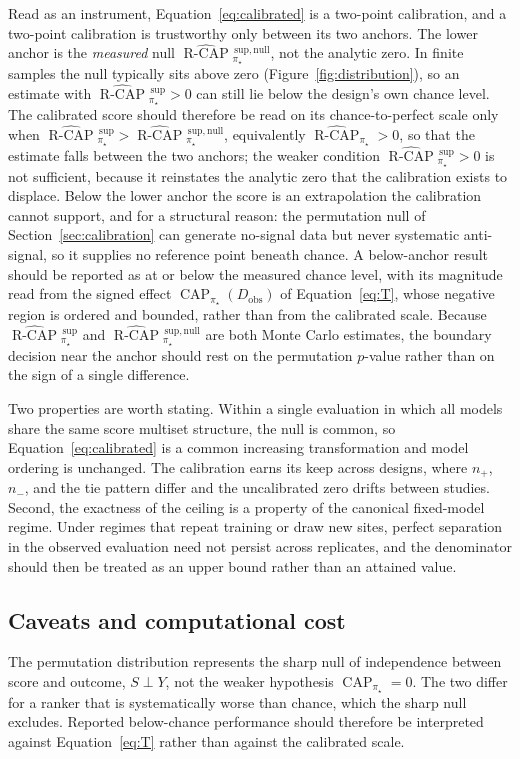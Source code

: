 \documentclass[11pt]{article}
\newcommand{\CAP}{\operatorname{CAP}}
\newcommand{\Tpi}{\CAP_{\pi_\star}}
\newcommand{\RCAPHat}{\widehat{\operatorname{R\text{-}CAP}}{}^{\,\mathrm{sup}}_{\pi_\star}}
\newcommand{\RCAPnullHat}{\widehat{\operatorname{R\text{-}CAP}}{}^{\,\mathrm{sup,null}}_{\pi_\star}}
\newcommand{\RCAPcalHat}{\widehat{\operatorname{R\text{-}CAP}}_{\pi_\star}}
\theoremstyle{remark}
\begin{document}
Read as an instrument, Equation~\eqref{eq:calibrated} is a two-point calibration, and a two-point calibration is trustworthy only between its two anchors. The lower anchor is the \emph{measured} null $\RCAPnullHat$, not the analytic zero. In finite samples the null typically sits above zero (Figure~\ref{fig:distribution}), so an estimate with $\RCAPHat>0$ can still lie below the design's own chance level. The calibrated score should therefore be read on its chance-to-perfect scale only when $\RCAPHat>\RCAPnullHat$, equivalently $\RCAPcalHat>0$, so that the estimate falls between the two anchors; the weaker condition $\RCAPHat>0$ is not sufficient, because it reinstates the analytic zero that the calibration exists to displace. Below the lower anchor the score is an extrapolation the calibration cannot support, and for a structural reason: the permutation null of Section~\ref{sec:calibration} can generate no-signal data but never systematic anti-signal, so it supplies no reference point beneath chance. A below-anchor result should be reported as at or below the measured chance level, with its magnitude read from the signed effect $\Tpi(D_{\mathrm{obs}})$ of Equation~\eqref{eq:T}, whose negative region is ordered and bounded, rather than from the calibrated scale. Because $\RCAPHat$ and $\RCAPnullHat$ are both Monte Carlo estimates, the boundary decision near the anchor should rest on the permutation $p$-value rather than on the sign of a single difference.

Two properties are worth stating. Within a single evaluation in which all models share the same score multiset structure, the null is common, so Equation~\eqref{eq:calibrated} is a common increasing transformation and model ordering is unchanged. The calibration earns its keep across designs, where $n_+$, $n_-$, and the tie pattern differ and the uncalibrated zero drifts between studies. Second, the exactness of the ceiling is a property of the canonical fixed-model regime. Under regimes that repeat training or draw new sites, perfect separation in the observed evaluation need not persist across replicates, and the denominator should then be treated as an upper bound rather than an attained value.

\subsection{Caveats and computational cost}

The permutation distribution represents the sharp null of independence between score and outcome, $S\perp Y$, not the weaker hypothesis $\CAP_{\pi_\star}=0$. The two differ for a ranker that is systematically worse than chance, which the sharp null excludes. Reported below-chance performance should therefore be interpreted against Equation~\eqref{eq:T} rather than against the calibrated scale.
\end{document}
